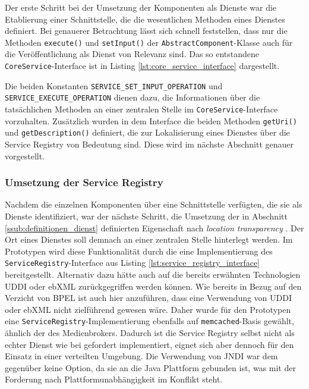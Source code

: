   Der erste Schritt bei der Umsetzung der Komponenten als Dienste war die Etablierung einer Schnittstelle, die die wesentlichen Methoden eines Dienstes definiert. Bei genauerer Betrachtung lässt sich schnell feststellen, dass nur die Methoden \verb!execute()! und \verb!setInput()! der \verb!AbstractComponent!-Klasse auch für die Veröffentlichung als Dienst von Relevanz sind. Das so entstandene \verb!CoreService!-Interface ist in Listing \ref{lst:core_service_interface} dargestellt.

  
  
  Die beiden Konstanten \verb!SERVICE_SET_INPUT_OPERATION! und \verb!SERVICE_EXECUTE_OPERATION! dienen dazu, die Informationen über die tatsächlichen Methoden an einer zentralen Stelle im \verb!CoreService!-Interface vorzuhalten. Zusätzlich wurden in dem Interface die beiden Methoden \verb!getUri()! und \verb!getDescription()! definiert, die zur Lokalisierung eines Dienstes über die Service Registry von Bedeutung sind. Diese wird im nächste Abschnitt genauer vorgestellt.

  
\subsubsection{Umsetzung der Service Registry} %
\label{ssub:umsetzung_der_service_registry}

  Nachdem die einzelnen Komponenten über eine Schnittstelle verfügten, die sie als Dienste identifiziert, war der nächste Schritt, die Umsetzung der in Abschnitt \ref{ssub:definitionen_dienst} definierten Eigenschaft nach \emph{location transparency} \citep{service_oriented_computing}. Der Ort eines Dienstes soll demnach an einer zentralen Stelle hinterlegt werden. Im Prototypen wird diese Funktionalität durch die eine Implementierung des \verb!ServiceRegistry!-Interface aus Listing \ref{lst:service_registry_interface} bereitgestellt. Alternativ dazu hätte auch auf die bereits erwähnten Technologien UDDI oder ebXML zurückgegriffen werden können. Wie bereits in Bezug auf den Verzicht von BPEL ist auch hier anzuführen, dass eine Verwendung von UDDI oder ebXML nicht zielführend gewesen wäre. Daher wurde für den Prototypen eine \verb!ServiceRegistry!-Implementierung ebenfalls auf \verb!memcached!-Basis gewählt, ähnlich der des Medienbrokers. Dadurch ist die Service Registry selbst nicht als echter Dienst wie bei \citep{service_oriented_computing} gefordert implementiert, eignet sich aber dennoch für den Einsatz in einer verteilten Umgebung. Die Verwendung von JNDI war dem gegenüber keine Option, da sie an die Java Plattform gebunden ist, was mit der Forderung nach Plattformunabhängigkeit \citep{service_oriented_computing} im Konflikt steht.


